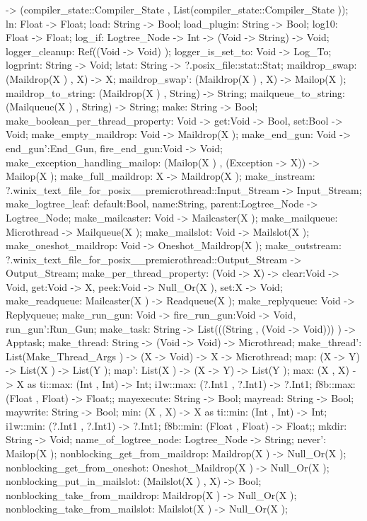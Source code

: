     ->
    (compiler_state::Compiler_State , List(compiler_state::Compiler_State ));
ln: Float -> Float;
load: String -> Bool;
load_plugin: String -> Bool;
log10: Float -> Float;
log_if: Logtree_Node -> Int -> (Void -> String) -> Void;
logger_cleanup: Ref((Void -> Void) );
logger_is_set_to: Void -> Log_To;
logprint: String -> Void;
lstat: String -> ?.posix_file::stat::Stat;
maildrop_swap: (Maildrop(X ) , X) -> X;
maildrop_swap': (Maildrop(X ) , X) -> Mailop(X );
maildrop_to_string: (Maildrop(X ) , String) -> String;
mailqueue_to_string: (Mailqueue(X ) , String) -> String;
make: String -> Bool;
make_boolean_per_thread_property: Void -> {get:Void -> Bool, set:Bool -> Void};
make_empty_maildrop: Void -> Maildrop(X );
make_end_gun: Void -> {end_gun':End_Gun, fire_end_gun:Void -> Void};
make_exception_handling_mailop: (Mailop(X ) , (Exception -> X)) -> Mailop(X );
make_full_maildrop: X -> Maildrop(X );
make_instream: ?.winix_text_file_for_posix__premicrothread::Input_Stream -> Input_Stream;
make_logtree_leaf: {default:Bool, name:String, parent:Logtree_Node} -> Logtree_Node;
make_mailcaster: Void -> Mailcaster(X );
make_mailqueue: Microthread -> Mailqueue(X );
make_mailslot: Void -> Mailslot(X );
make_oneshot_maildrop: Void -> Oneshot_Maildrop(X );
make_outstream: ?.winix_text_file_for_posix__premicrothread::Output_Stream -> Output_Stream;
make_per_thread_property:
(Void -> X) -> {clear:Void -> Void, get:Void -> X, peek:Void -> Null_Or(X ), set:X -> Void};
make_readqueue: Mailcaster(X ) -> Readqueue(X );
make_replyqueue: Void -> Replyqueue;
make_run_gun: Void -> {fire_run_gun:Void -> Void, run_gun':Run_Gun};
make_task: String -> List(((String , (Void -> Void))) ) -> Apptask;
make_thread: String -> (Void -> Void) -> Microthread;
make_thread': List(Make_Thread_Args ) -> (X -> Void) -> X -> Microthread;
map: (X -> Y) -> List(X ) -> List(Y );
map': List(X ) -> (X -> Y) -> List(Y );
max:
(X , X) -> X
as  ti::max: (Int , Int) -> Int;
    i1w::max: (?.Int1 , ?.Int1) -> ?.Int1;
    f8b::max: (Float , Float) -> Float;;
mayexecute: String -> Bool;
mayread: String -> Bool;
maywrite: String -> Bool;
min:
(X , X) -> X
as  ti::min: (Int , Int) -> Int;
    i1w::min: (?.Int1 , ?.Int1) -> ?.Int1;
    f8b::min: (Float , Float) -> Float;;
mkdir: String -> Void;
name_of_logtree_node: Logtree_Node -> String;
never': Mailop(X );
nonblocking_get_from_maildrop: Maildrop(X ) -> Null_Or(X );
nonblocking_get_from_oneshot: Oneshot_Maildrop(X ) -> Null_Or(X );
nonblocking_put_in_mailslot: (Mailslot(X ) , X) -> Bool;
nonblocking_take_from_maildrop: Maildrop(X ) -> Null_Or(X );
nonblocking_take_from_mailslot: Mailslot(X ) -> Null_Or(X );
